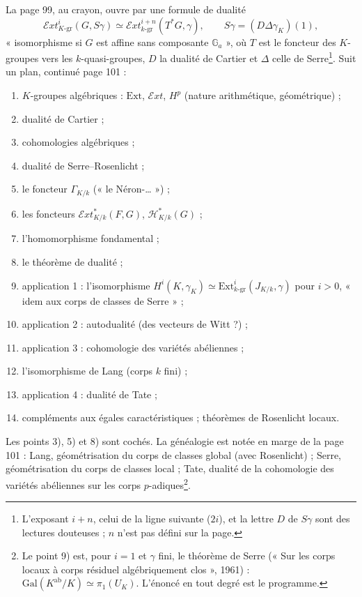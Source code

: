 \documentclass[11pt,a4paper]{article}
\begin{document}
La page 99, au crayon, ouvre par une formule de dualité
\[
\mathcal{E}xt^i_{K\text{-gr}}(G, S\gamma) \simeq
\mathcal{E}xt^{i+n}_{k\text{-gr}}(T^{*}G, \gamma),
\qquad S\gamma = (D\Delta\gamma_K)(1),
\]
« isomorphisme si $G$ est affine sans composante $\mathbb{G}_a$ », où $T$ est le
foncteur des $K$-groupes vers les $k$-quasi-groupes, $D$ la dualité de Cartier et
$\Delta$ celle de Serre\footnote{L'exposant $i + n$, celui de la ligne suivante
($2i$), et la lettre $D$ de $S\gamma$ sont des lectures douteuses ; $n$ n'est pas
défini sur la page.}. Suit un plan, continué page 101 :
\begin{enumerate}
\item[1)] $K$-groupes algébriques : $\mathrm{Ext}$, $\mathcal{E}xt$, $H^p$
(nature arithmétique, géométrique) ;
\item[2)] dualité de Cartier ;
\item[3)] cohomologies algébriques ;
\item[4)] dualité de Serre–Rosenlicht ;
\item[5)] le foncteur $\Gamma_{K/k}$ (« le Néron-… ») ;
\item[6)] les foncteurs $\mathcal{E}xt^{*}_{K/k}(F, G)$, $\mathcal{H}^{*}_{K/k}(G)$ ;
\item[7)] l'homomorphisme fondamental ;
\item[8)] le théorème de dualité ;
\item[9)] application 1 : l'isomorphisme $H^i(K, \gamma_K) \simeq
\mathrm{Ext}^i_{k\text{-gr}}(J_{K/k}, \gamma)$ pour $i > 0$, « idem aux corps de
classes de Serre » ;
\item[10)] application 2 : autodualité (des vecteurs de Witt ?) ;
\item[11)] application 3 : cohomologie des variétés abéliennes ;
\item[12)] l'isomorphisme de Lang (corps $k$ fini) ;
\item[13)] application 4 : dualité de Tate ;
\item[14)] compléments aux égales caractéristiques ; théorèmes de Rosenlicht
locaux.
\end{enumerate}
Les points 3), 5) et 8) sont cochés. La généalogie est notée en marge de la
page 101 : Lang, géométrisation du corps de classes global (avec Rosenlicht) ;
Serre, géométrisation du corps de classes local ; Tate, dualité de la
cohomologie des variétés abéliennes sur les corps $p$-adiques\footnote{Le point
9) est, pour $i = 1$ et $\gamma$ fini, le théorème de Serre (« Sur les corps
locaux à corps résiduel algébriquement clos », 1961) :
$\mathrm{Gal}(K^{\mathrm{ab}}/K) \simeq \pi_1(U_K)$. L'énoncé en tout degré est le
programme.}.
\end{document}
